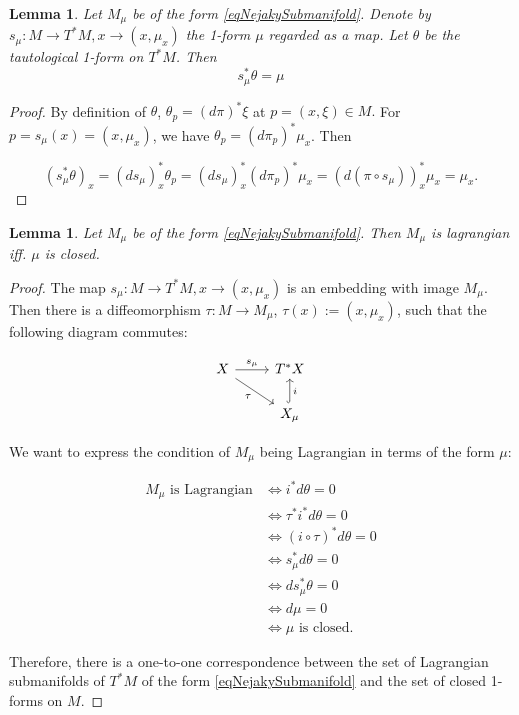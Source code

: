 \documentclass{article}
\numberwithin{theorem}{section}
\newtheorem{lemma}[theorem]{Lemma} %
\theoremstyle{definition}
\begin{document}
\begin{lemma}
    Let $M_\mu$ be of the form \eqref{eqNejakySubmanifold}. Denote by $s_\mu : M \rightarrow T^*M, x \rightarrow (x, \mu_x)$ the 1-form $\mu$ regarded as a map. Let $\theta$ be the tautological 1-form on $T^*M$. Then
    \begin{equation*}
        s^*_\mu \theta = \mu
    \end{equation*}
\end{lemma}
\begin{proof}
    By definition of $\theta$, $\theta_p = (d\pi)^* \xi$ at $p = (x, \xi) \in M.$
For $p = s_\mu(x) = (x, \mu_x)$, we have $\theta_p = (d\pi_p)^* \mu_x$. Then 

\begin{equation*}
    (s_\mu^* \theta)_x = (ds_\mu)^*_x \theta_p = (ds_\mu)^*_x (d\pi_p)^* \mu_x = \left( d(\pi \circ s_\mu) \right)^*_x \mu_x = \mu_x.
\end{equation*}
\end{proof}

\begin{lemma}
    Let $M_\mu$ be of the form \eqref{eqNejakySubmanifold}. Then $M_\mu$ is lagrangian iff. $\mu$ is closed.
\end{lemma}
\begin{proof}
    The map $s_\mu : M \rightarrow T^*M, x \rightarrow (x, \mu_x)$ is an embedding with image $M_\mu$. Then there is a diffeomorphism \( \tau: M \to M_\mu \), \( \tau(x) := (x, \mu_x) \), such that the following diagram commutes:

    \[
    \begin{tikzcd}
        X \arrow[r, "s_\mu"] \arrow[dr, "\tau"'] & T^*X \\
        & X_\mu \arrow[u, hook, "i"']
    \end{tikzcd}
    \]
    
    We want to express the condition of \( M_\mu \) being Lagrangian in terms of the form \( \mu \):

    \begin{equation}
        \begin{aligned}
        M_\mu \text{ is Lagrangian} 
        &\iff i^* d\theta = 0 \\
        &\iff \tau^* i^* d\theta = 0 \\
        &\iff (i \circ \tau)^* d\theta = 0 \\
        &\iff s_\mu^* d\theta = 0 \\
        &\iff d s_\mu^* \theta = 0 \\
        &\iff d\mu = 0 \\
        &\iff \mu \text{ is closed.}
        \end{aligned}
    \end{equation}

    Therefore, there is a one-to-one correspondence between the set of Lagrangian submanifolds of $T^*M$ of the form \eqref{eqNejakySubmanifold} and the set of closed 1-forms on $M$.
\end{proof}
\end{document}
